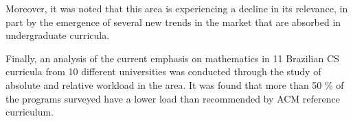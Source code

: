 \documentclass[conference]{IEEEtran}
\begin{document}
	Moreover, it was noted that this area is experiencing a decline in its relevance, in part by the emergence of several new trends in the market that are absorbed in undergraduate curricula.
	
	Finally, an analysis of the current emphasis on mathematics in 11 Brazilian CS curricula from 10 different universities was conducted through the study of absolute and relative workload in the area. It was found that more than 50 \% of the programs surveyed have a lower load than recommended by ACM reference curriculum.
	
%
%



%
%
\end{document}
